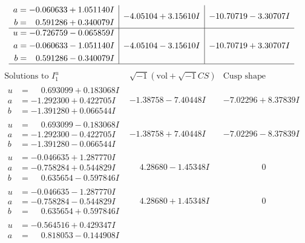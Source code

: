 \documentclass[1p]{elsarticle_modified}
\theoremstyle{definition}
\newcommand{\I}{\sqrt{-1}}
\begin{document}
$$\begin{array}{c|c|c}
\begin{aligned}
a &= -0.060633 + 1.051140 I \\
b &= \phantom{-}0.591286 + 0.340079 I\end{aligned}
 & -4.05104 + 3.15610 I & -10.70719 - 3.30707 I \\ \hline\begin{aligned}
u &= -0.726759 - 0.065859 I \\
a &= -0.060633 - 1.051140 I \\
b &= \phantom{-}0.591286 - 0.340079 I\end{aligned}
 & -4.05104 - 3.15610 I & -10.70719 + 3.30707 I\\
 \hline 
 \end{array}$$\newpage$$\begin{array}{c|c|c}  
\text{Solutions to }I^u_{1}& \I (\text{vol} + \sqrt{-1}CS) & \text{Cusp shape}\\
 \hline 
\begin{aligned}
u &= \phantom{-}0.693099 + 0.183068 I \\
a &= -1.292300 + 0.422705 I \\
b &= -1.391280 + 0.066544 I\end{aligned}
 & -1.38758 - 7.40448 I & -7.02296 + 8.37839 I \\ \hline\begin{aligned}
u &= \phantom{-}0.693099 - 0.183068 I \\
a &= -1.292300 - 0.422705 I \\
b &= -1.391280 - 0.066544 I\end{aligned}
 & -1.38758 + 7.40448 I & -7.02296 - 8.37839 I \\ \hline\begin{aligned}
u &= -0.046635 + 1.287770 I \\
a &= -0.758284 + 0.544829 I \\
b &= \phantom{-}0.635654 - 0.597846 I\end{aligned}
 & \phantom{-}4.28680 - 1.45348 I & \phantom{-0.000000 } 0 \\ \hline\begin{aligned}
u &= -0.046635 - 1.287770 I \\
a &= -0.758284 - 0.544829 I \\
b &= \phantom{-}0.635654 + 0.597846 I\end{aligned}
 & \phantom{-}4.28680 + 1.45348 I & \phantom{-0.000000 } 0 \\ \hline\begin{aligned}
u &= -0.564516 + 0.429347 I \\
a &= \phantom{-}0.818053 - 0.144908 I \\

\end{aligned}
\end{array}$$
\end{document}

